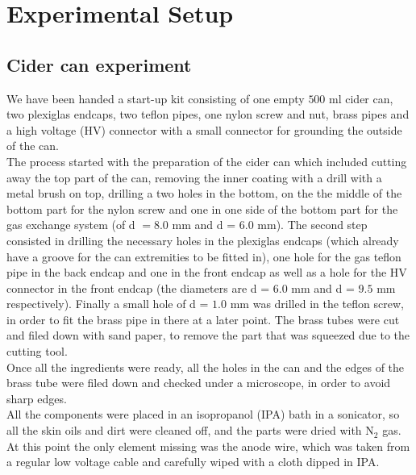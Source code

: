 \section{Experimental Setup}
\subsection{Cider can experiment}
We have been handed a start-up kit consisting of one empty $500$ ml cider can, two plexiglas endcaps, two teflon pipes, one nylon screw and nut, brass pipes and a high voltage (HV) connector with a small connector for grounding the outside of the can. \\ The process started with the preparation of the cider can which included cutting away the top part of the can, removing the inner coating with a drill with a metal brush on top, drilling a two holes in the bottom, on the the middle of the bottom part for the nylon screw and one in one side of the bottom part for the gas exchange system (of d $= 8.0$ mm and d = $6.0$ mm). The second step consisted in drilling the necessary holes in the plexiglas endcaps (which already have a groove for the can extremities to be fitted in), one hole for the gas teflon pipe in the back endcap and one in the front endcap as well as a hole for the HV connector in the front endcap (the diameters are d = $6.0$ mm and d = $9.5$ mm respectively). Finally a small hole of d = $1.0$ mm was drilled in the teflon screw, in order to fit the brass pipe in there at a later point. The brass tubes were cut and filed down with sand paper, to remove the part that was squeezed due to the cutting tool. \\ Once all the ingredients were ready, all the holes in the can and the edges of the brass tube were filed down and checked under a microscope, in order to avoid sharp edges. \\ All the components were placed in an isopropanol (IPA) bath in a sonicator, so all the skin oils and dirt were cleaned off, and the parts were dried with N$_2$ gas. At this point the only element missing was the anode wire, which was taken from a regular low voltage cable and carefully wiped with a cloth dipped in IPA. \\
